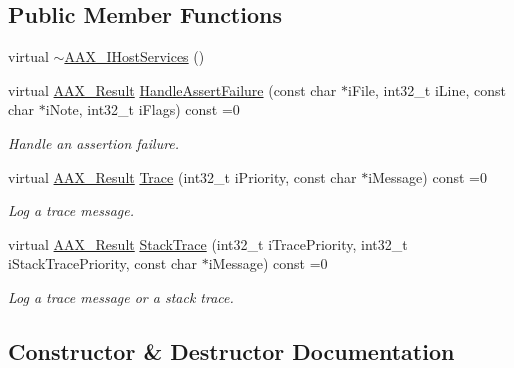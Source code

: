 \subsection*{Public Member Functions}
\begin{DoxyCompactItemize}
\item 
virtual \hyperlink{a00103_a504167c87343284982c0d9b13305c619}{$\sim$\+A\+A\+X\+\_\+\+I\+Host\+Services} ()
\item 
virtual \hyperlink{a00149_a4d8f69a697df7f70c3a8e9b8ee130d2f}{A\+A\+X\+\_\+\+Result} \hyperlink{a00103_a0ee94b4e4e98eed868a28f39d6fbe675}{Handle\+Assert\+Failure} (const char $\ast$i\+File, int32\+\_\+t i\+Line, const char $\ast$i\+Note, int32\+\_\+t i\+Flags) const =0
\begin{DoxyCompactList}\small\item\em Handle an assertion failure. \end{DoxyCompactList}\item 
virtual \hyperlink{a00149_a4d8f69a697df7f70c3a8e9b8ee130d2f}{A\+A\+X\+\_\+\+Result} \hyperlink{a00103_a87ecb31633740f1c2c2e9afda6a0068b}{Trace} (int32\+\_\+t i\+Priority, const char $\ast$i\+Message) const =0
\begin{DoxyCompactList}\small\item\em Log a trace message. \end{DoxyCompactList}\item 
virtual \hyperlink{a00149_a4d8f69a697df7f70c3a8e9b8ee130d2f}{A\+A\+X\+\_\+\+Result} \hyperlink{a00103_a1b55424be317b91810c70b0b1917934f}{Stack\+Trace} (int32\+\_\+t i\+Trace\+Priority, int32\+\_\+t i\+Stack\+Trace\+Priority, const char $\ast$i\+Message) const =0
\begin{DoxyCompactList}\small\item\em Log a trace message or a stack trace. \end{DoxyCompactList}\end{DoxyCompactItemize}


\subsection{Constructor \& Destructor Documentation}
\hypertarget{a00103_a504167c87343284982c0d9b13305c619}{}
